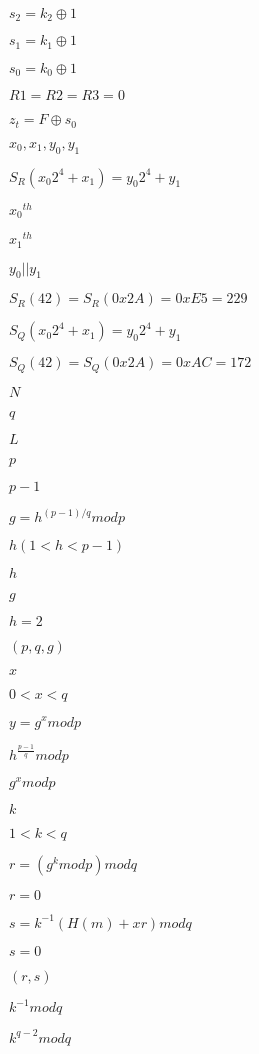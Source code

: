 \documentclass{article}
\begin{document}
$ s_2=k_2 \oplus 1$
\pagebreak

$ s_1=k_1 \oplus 1$
\pagebreak

$ s_0=k_0 \oplus 1$
\pagebreak

$ R1 = R2 = R3 = 0$
\pagebreak

$ z_t = F \oplus s_0$
\pagebreak

$ x_0, x_1, y_0, y_1$
\pagebreak

$ S_R(x_0 {2}^{4}+x_1) = y_0 {2}^{4} + y_1$
\pagebreak

$ {x_0}^{th}$
\pagebreak

$ {x_1}^{th}$
\pagebreak

$ y_0 || y_1$
\pagebreak

$ S_R(42) = S_R(0x2A) = 0xE5 = 229$
\pagebreak

$ S_Q(x_0 {2}^{4}+x_1) = y_0 {2}^{4} + y_1$
\pagebreak

$ S_Q(42) = S_Q(0x2A) = 0xAC = 172$
\pagebreak

$ N$
\pagebreak

$ q$
\pagebreak

$ L$
\pagebreak

$ p$
\pagebreak

$ p - 1$
\pagebreak

$ g = {h}^{(p - 1)/q} mod p$
\pagebreak

$ h (1 < h < p - 1)$
\pagebreak

$ h$
\pagebreak

$ g$
\pagebreak

$ h = 2$
\pagebreak

$ (p, q, g)$
\pagebreak

$ x$
\pagebreak

$ 0 < x < q$
\pagebreak

$ y = {g}^{x} mod p$
\pagebreak

$ {h}^{ \frac{p - 1}{q}} mod p$
\pagebreak

$ {g}^{x} mod p$
\pagebreak

$ k$
\pagebreak

$ 1 < k < q$
\pagebreak

$ r = ({g}^{k} mod p) mod q$
\pagebreak

$ r = 0$
\pagebreak

$ s = {k}^{-1} (H(m) + xr) mod q$
\pagebreak

$ s = 0$
\pagebreak

$ (r, s)$
\pagebreak

$ {k}^{-1} mod q$
\pagebreak

$ {k}^{q - 2} mod q$
\pagebreak
\end{document}
